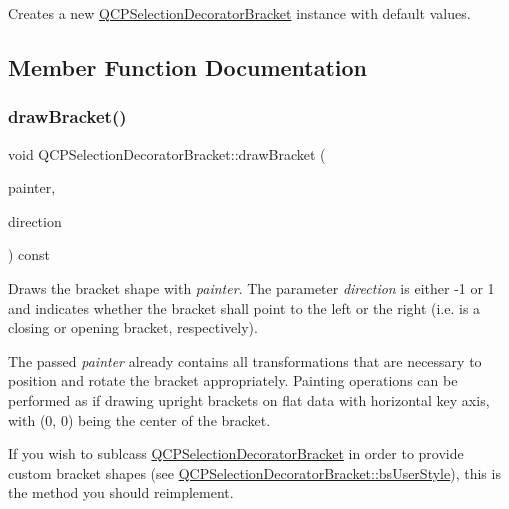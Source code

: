 Creates a new \hyperlink{class_q_c_p_selection_decorator_bracket}{Q\+C\+P\+Selection\+Decorator\+Bracket} instance with default values. 

\subsection{Member Function Documentation}
\mbox{\label{class_q_c_p_selection_decorator_bracket_a57b65b5508d5bd0f27c9318f3d4646be}} 
\subsubsection{\texorpdfstring{draw\+Bracket()}{drawBracket()}}
{\footnotesize\ttfamily void Q\+C\+P\+Selection\+Decorator\+Bracket\+::draw\+Bracket (\begin{DoxyParamCaption}\item[{\hyperlink{class_q_c_p_painter}{Q\+C\+P\+Painter} $\ast$}]{painter,  }\item[{int}]{direction }\end{DoxyParamCaption}) const\hspace{0.3cm}{\ttfamily [virtual]}}

Draws the bracket shape with {\itshape painter}. The parameter {\itshape direction} is either -\/1 or 1 and indicates whether the bracket shall point to the left or the right (i.\+e. is a closing or opening bracket, respectively).

The passed {\itshape painter} already contains all transformations that are necessary to position and rotate the bracket appropriately. Painting operations can be performed as if drawing upright brackets on flat data with horizontal key axis, with (0, 0) being the center of the bracket.

If you wish to sublcass \hyperlink{class_q_c_p_selection_decorator_bracket}{Q\+C\+P\+Selection\+Decorator\+Bracket} in order to provide custom bracket shapes (see \hyperlink{class_q_c_p_selection_decorator_bracket_aa6d18517ec0553575bbef0de4252336eaacc82a3e9ed4908e11dd78678e59705e}{Q\+C\+P\+Selection\+Decorator\+Bracket\+::bs\+User\+Style}), this is the method you should reimplement. \mbox{\label{class_q_c_p_selection_decorator_bracket_a1ceb893063ea3d7197a24098018f4bfb}} 

